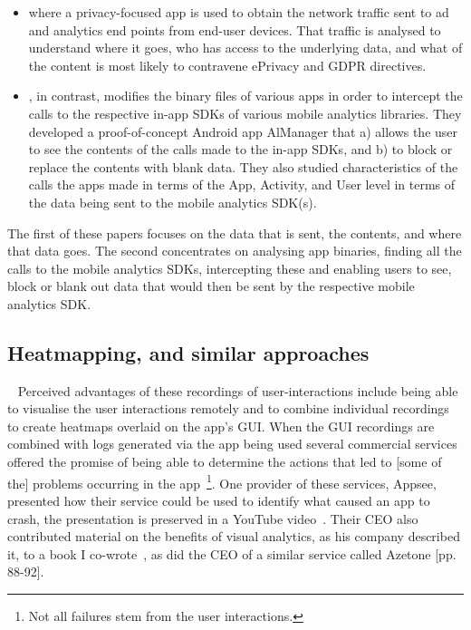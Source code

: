 \begin{itemize}
        \item \citet{razaghpanah2018_apps_trackers_privacy_and_regulators_a_global_study_of_the_mobile_tracking_ecosystem} where a privacy-focused app is used to obtain the network traffic sent to ad and analytics end points from end-user devices. That traffic is analysed to understand where it goes, who has access to the underlying data, and what of the content is most likely to contravene ePrivacy and GDPR directives.
        \item \citet{liu2020_privacy_risk_analysis_and_mitigation_of_analytics_libraries_in_the_android_ecosystem}, in contrast, modifies the binary files of various apps in order to intercept the calls to the respective in-app SDKs of various mobile analytics libraries. They developed a proof-of-concept Android app AlManager that a) allows the user to see the contents of the calls made to the in-app SDKs, and b) to block or replace the contents with blank data. They also studied characteristics of the calls the apps made in terms of the App, Activity, and User level in terms of the data being sent to the mobile analytics SDK(s).
\end{itemize}

The first of these papers focuses on the data that is sent, the contents, and where that data goes. The second concentrates on analysing app binaries, finding all the calls to the mobile analytics SDKs, intercepting these and enabling users to see, block or blank out data that would then be sent by the respective mobile analytics SDK.

\subsection{Heatmapping, and similar approaches}~\label{section-heatmapping} 
Perceived advantages of these recordings of user-interactions include being able to visualise the user interactions remotely and to combine individual recordings to create heatmaps overlaid on the app's GUI. When the GUI recordings are combined with logs generated via the app being used several commercial services offered the promise of being able to determine the actions that led to [some of the] problems occurring in the app~\footnote{Not all failures stem from the user interactions.}. One provider of these services, Appsee, presented how their service could be used to identify what caused an app to crash, the presentation is preserved in a YouTube video~\citep{appsee2015_youtube_visual_analytics_budapest_mobile_meetup}. Their CEO also contributed material on the benefits of visual analytics, as his company described it, to a book I co-wrote~\citep[pp. 94-95]{harty_aymer_playbook_2016}, as did the CEO of a similar service called Azetone [pp. 88-92]. %

